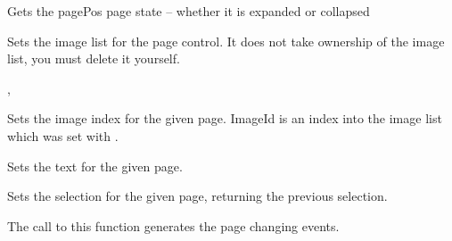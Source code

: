 
Gets the pagePos page state -- whether it is expanded or collapsed



\label{wxtreebooksetimagelist}


Sets the image list for the page control. It does not take ownership of the image list, you must delete it yourself.


, 



\label{wxtreebooksetpageimage}


Sets the image index for the given page. ImageId is an index into the image list
which was set with .



\label{wxtreebooksetpagetext}


Sets the text for the given page.



\label{wxtreebooksetselection}


Sets the selection for the given page, returning the previous selection.

The call to this function generates the page changing events.



